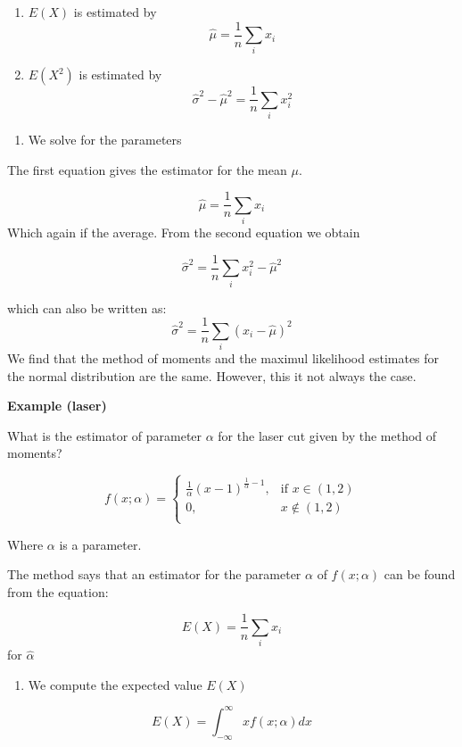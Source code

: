 \documentclass[
]{book}
\providecommand{\tightlist}{%
  \setlength{\itemsep}{0pt}\setlength{\parskip}{0pt}}
\begin{document}
\begin{enumerate}
\def\labelenumi{\alph{enumi}.}
\tightlist
\item
  \(E(X)\) is estimated by \[\hat{\mu}=\frac{1}{n}\sum_i x_i\]
\item
  \(E(X^2)\) is estimated by \[\hat{\sigma}^2-\hat{\mu}^2=\frac{1}{n}\sum_i x^2_i\]
\end{enumerate}

\begin{enumerate}
\def\labelenumi{\arabic{enumi}.}
\setcounter{enumi}{2}
\tightlist
\item
  We solve for the parameters
\end{enumerate}

The first equation gives the estimator for the mean \(\mu\).

\[\hat{\mu}=\frac{1}{n}\sum_i x_i\]
Which again if the average. From the second equation we obtain

\[\hat{\sigma}^2=  \frac{1}{n} \sum_i x^2_i-\hat{\mu}^2\]

which can also be written as:
\[\hat{\sigma}^2=\frac{1}{n} \sum_i(x_i-\hat{\mu})^2\]
We find that the method of moments and the maximul likelihood estimates for the normal distribution are the same. However, this it not always the case.

\textbf{Example (laser)}

What is the estimator of parameter \(\alpha\) for the laser cut given by the method of moments?

\[
    f(x; \alpha)= 
\begin{cases}
\frac{1}{\alpha}(x-1)^{\frac{1}{\alpha}-1},& \text{if } x \in (1,2)\\
    0,& x \notin (1,2)\\
\end{cases}
\]

Where \(\alpha\) is a parameter.

The method says that an estimator for the parameter \(\alpha\) of \(f(x;\alpha)\) can be found from the equation:

\[E(X)=\frac{1}{n}\sum_i x_i\]
for \(\hat{\alpha}\)

\begin{enumerate}
\def\labelenumi{\arabic{enumi}.}
\tightlist
\item
  We compute the expected value \(E(X)\)
\end{enumerate}

\[E(X)=\int_{-\infty}^{\infty} x f(x;\alpha)dx\]
\end{document}
